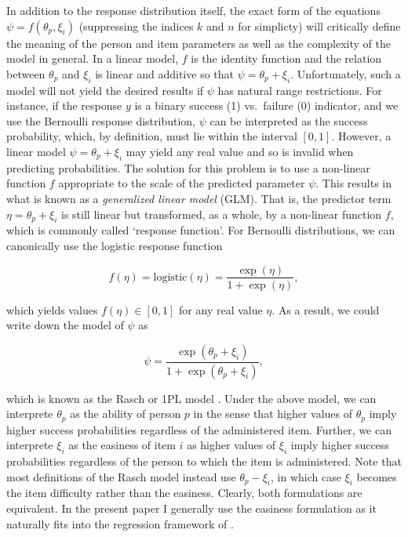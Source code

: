 \documentclass[
]{jss}
\begin{document}
In addition to the response distribution itself, the exact form of the
equations \(\psi = f(\theta_p, \xi_i)\) (suppressing the indices \(k\)
and \(n\) for simplicty) will critically define the meaning of the
person and item parameters as well as the complexity of the model in
general. In a linear model, \(f\) is the identity function and the
relation between \(\theta_p\) and \(\xi_i\) is linear and additive so
that \(\psi = \theta_p + \xi_i\). Unfortunately, such a model will not
yield the desired results if \(\psi\) has natural range restrictions.
For instance, if the response \(y\) is a binary success (1) vs.~failure
(0) indicator, and we use the Bernoulli response distribution, \(\psi\)
can be interpreted as the success probability, which, by definition,
must lie within the interval \([0, 1]\). However, a linear model
\(\psi = \theta_p + \xi_i\) may yield any real value and so is invalid
when predicting probabilities. The solution for this problem is to use a
non-linear function \(f\) appropriate to the scale of the predicted
parameter \(\psi\). This results in what is known as a \emph{generalized
linear model} (GLM). That is, the predictor term
\(\eta = \theta_p + \xi_i\) is still linear but transformed, as a whole,
by a non-linear function \(f\), which is commonly called `response
function'. For Bernoulli distributions, we can canonically use the
logistic response function

\[
f(\eta) = \text{logistic}(\eta) = \frac{\exp(\eta)}{1 + \exp(\eta)},
\]

which yields values \(f(\eta) \in [0, 1]\) for any real value \(\eta\).
As a result, we could write down the model of \(\psi\) as

\[
\psi = \frac{\exp(\theta_p + \xi_i)}{1 + \exp(\theta_p + \xi_i)},
\]

which is known as the Rasch or 1PL model \citep{bond2013}. Under the
above model, we can interprete \(\theta_p\) as the ability of person
\(p\) in the sense that higher values of \(\theta_p\) imply higher
success probabilities regardless of the administered item. Further, we
can interprete \(\xi_i\) as the easiness of item \(i\) as higher values
of \(\xi_i\) imply higher success probabilities regardless of the person
to which the item is administered. Note that most definitions of the
Rasch model instead use \(\theta_p - \xi_i\), in which case \(\xi_i\)
becomes the item difficulty rather than the easiness. Clearly, both
formulations are equivalent. In the present paper I generally use the
easiness formulation as it naturally fits into the regression framework
of .
\end{document}
